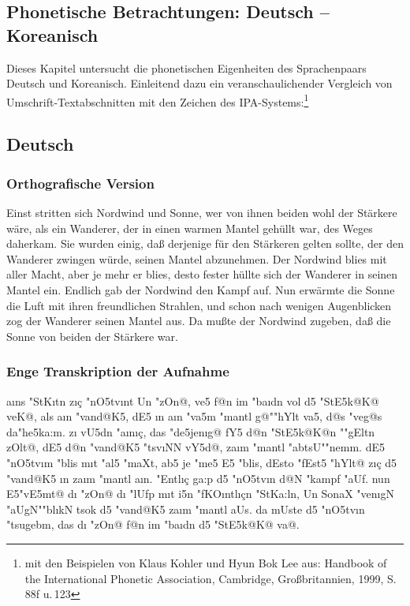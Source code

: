 \documentclass[a4paper,11pt]{article}		%
\begin{document}
\frenchspacing %
\setlength{\parindent}{0pt}

\begin{CJK}{UTF8}{mj}	%
\vspace*{-2cm}
\section{Phonetische Betrachtungen: Deutsch -- Koreanisch}
Dieses Kapitel untersucht die phonetischen Eigenheiten des Sprachenpaars Deutsch und Koreanisch. Einleitend dazu ein veranschaulichender Vergleich von Umschrift-Textabschnitten mit den Zeichen des IPA-Systems:\footnote{mit den Beispielen von Klaus Kohler und Hyun Bok Lee aus: Handbook of the International Phonetic Association, Cambridge, Großbritannien, 1999, S. 88f u.\,123}

\subsection{Deutsch}

\subsubsection{Orthografische Version}
Einst stritten sich Nordwind und Sonne, wer von ihnen beiden wohl der Stärkere wäre, als ein Wanderer, der in einen warmen Mantel gehüllt war, des Weges daherkam. Sie wurden einig, daß derjenige für den Stärkeren gelten sollte, der den Wanderer zwingen würde, seinen Mantel abzunehmen. Der Nordwind blies mit aller Macht, aber je mehr er blies, desto fester hüllte sich der Wanderer in seinen Mantel ein. Endlich gab der Nordwind den Kampf auf. Nun erwärmte die Sonne die Luft mit ihren freundlichen Strahlen, und schon nach wenigen Augenblicken zog der Wanderer seinen Mantel aus. Da mußte der Nordwind zugeben, daß die Sonne von beiden der Stärkere war.

\subsubsection{Enge Transkription der Aufnahme}
\begin{IPA}
a\i ns "StK\i tn z\i\c{c} "nO5tv\i nt Un "zOn@, ve5 f@n im "ba\i dn vol d5 "StE5k@K@ veK@, als a\i n "vand@K5, dE5 \i n a\i n "va5m "mantl g@""hYlt va5, d@s "veg@s da"he5ka:m. z\i{} vU5dn "a\i n\i \c{c}, das "de5jen\i g@ fY5 d@n "StE5k@K@n ""gEltn zOlt@, dE5 d@n "vand@K5 "tsv\i NN vY5d@, za\i m "mantl "abtsU""nemm. dE5 "nO5tv\i m "blis m\i t "al5 "maXt, ab5 je "me5 E5 "blis, dEsto "fEst5 "hYlt@ z\i \c{c} d5 "vand@K5 \i n za\i m "mantl a\i n. "Entl\i \c{c} ga:p d5 "nO5tv\i n d@N "kampf "aUf. nun E5"vE5mt@ d\i{} "zOn@ d\i{} "lUfp m\i t i5n "fKO\i ntl\i \c{c}n "StKa:ln, Un SonaX "ven\i gN "aUgN""bl\i kN tsok d5 "vand@K5 za\i m "mantl aUs. da mUste d5 "nO5tv\i n "tsugebm, das d\i{} "zOn@ f@n im "ba\i dn d5 "StE5k@K@ va@. 


\end{IPA}
\end{CJK}
\end{document}
